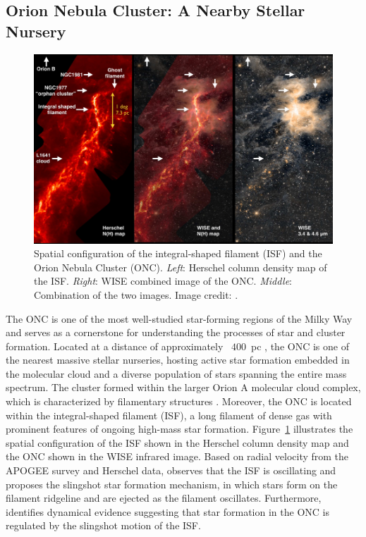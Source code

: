 \documentclass[12pt]{ucsddissertation}
\begin{document}
\begin{CJK*}{UTF8}{gbsn}
%
%
\subsection*{Orion Nebula Cluster: A Nearby Stellar Nursery}%


\begin{figure}[htb!]
    \centering
    \includegraphics[width=\linewidth]{figures/intro/ISF.pdf}
    \caption[Integral-Shaped Filament]{Spatial configuration of the integral-shaped filament (ISF) and the Orion Nebula Cluster (ONC). \textit{Left}: Herschel column density map of the ISF. \textit{Right}: WISE combined image of the ONC. \textit{Middle}: Combination of the two images. Image credit: \citet{Stutz-2016, Lang-2014}.}
    \label{fig:isf}
\end{figure}

The ONC is one of the most well-studied star-forming regions of the Milky Way and serves as a cornerstone for understanding the processes of star and cluster formation. Located at a distance of approximately ~$400$~pc \citep[][]{Menten-2007, Sandstrom-2007, Kounkel-2018}, the ONC is one of the nearest massive stellar nurseries, hosting active star formation embedded in the molecular cloud and a diverse population of stars spanning the entire mass spectrum. The cluster formed within the larger Orion A molecular cloud complex, which is characterized by filamentary structures \citep[][]{Hacar-2018}. Moreover, the ONC is located within the integral-shaped filament (ISF), a long filament of dense gas with prominent features of ongoing high-mass star formation\citep[][]{Bally-1987}. Figure~\ref{fig:isf} illustrates the spatial configuration of the ISF shown in the Herschel column density map and the ONC shown in the WISE infrared image\citep[][]{Stutz-2016}. Based on radial velocity from the APOGEE survey and Herschel data, \citet{Stutz-2016} observes that the ISF is oscillating and proposes the slingshot star formation mechanism, in which stars form on the filament ridgeline and are ejected as the filament oscillates. Furthermore, \citet{Stutz-2018} identifies dynamical evidence suggesting that star formation in the ONC is regulated by the slingshot motion of the ISF. 


\end{CJK*}
\end{document}
